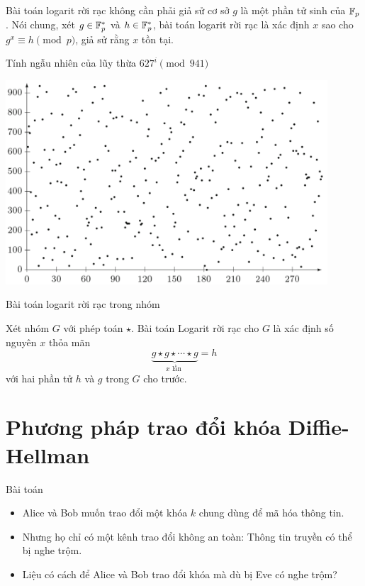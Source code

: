 \begin{frame}
  \begin{rmrk}
    Bài toán logarit rời rạc không cần phải giả sử cơ sở $g$ là một phần tử sinh của $\mathbb{F}_p$. Nói chung, xét $g \in \mathbb{F}_p^*$ và $h \in \mathbb{F}_p^*$, bài toán logarit rời rạc là xác định $x$ sao cho $g^x \equiv h \pmod{p}$, giả sử rằng $x$ tồn tại. 
  \end{rmrk}
\end{frame}

\begin{frame}{Tính  ngẫu nhiên của lũy thừa $627^i \pmod{941}$}
  \begin{block}{}
    \centering
    \includegraphics[width=0.9\textwidth]{fig22.pdf}
  \end{block}
\end{frame}

\begin{frame}{Bài toán logarit rời rạc trong nhóm}
  \begin{dfntn}
Xét nhóm $G$ với phép toán $\star$. Bài toán Logarit rời rạc cho $G$ là xác định số nguyên $x$ thỏa mãn 
$$
\underbrace{g\star g\star \cdots \star g}_{x \text{ lần }} = h 
$$
với hai phần tử $h$ và $g$ trong $G$ cho trước.
  \end{dfntn}
\end{frame}

\section{Phương pháp trao đổi khóa Diffie-Hellman}

\begin{frame}{Bài toán}
  \begin{itemize}
  \item Alice và Bob muốn trao đổi một khóa $k$ chung dùng để mã hóa thông tin.
  \item Nhưng họ chỉ có một kênh trao đổi không an toàn: Thông tin truyền có thể  bị nghe trộm. 
  \item Liệu có cách để Alice và Bob trao đổi khóa mà dù bị Eve có nghe trộm?
  \end{itemize}
\end{frame}

